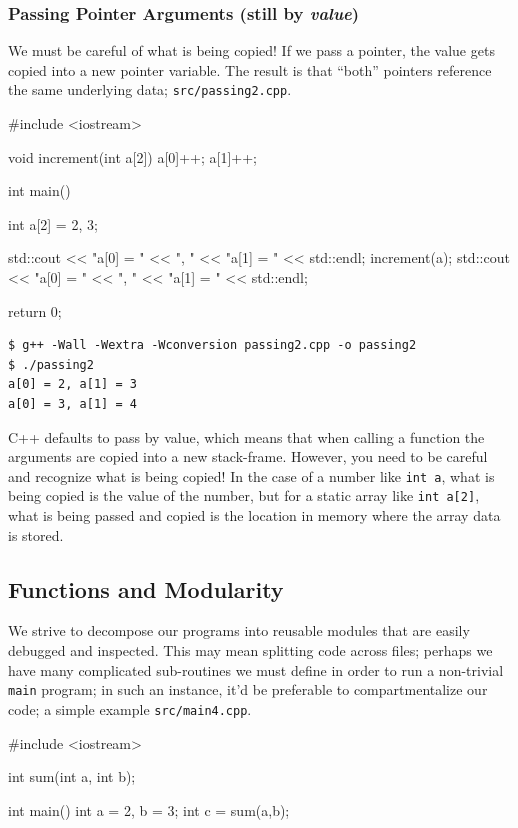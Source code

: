 \documentclass[12pt,letterpaper,twoside]{article}
\begin{document}
\subsubsection{Passing Pointer Arguments (still by \emph{value})}
We must be careful of what is being copied! If we pass a pointer, the value gets 
copied into a new pointer variable. The result is that ``both'' pointers reference the same
underlying data;
\texttt{src/passing2.cpp}.

\begin{cpp}
#include <iostream>

void increment(int a[2]) {
  a[0]++;
  a[1]++;
}

int main() {
  int a[2] = {2, 3};

  std::cout << "a[0] = " << ", " << "a[1] = " << std::endl;
  increment(a);
  std::cout << "a[0] = " << ", " << "a[1] = " << std::endl;
  
  return 0;
}
\end{cpp}

\begin{verbatim}
$ g++ -Wall -Wextra -Wconversion passing2.cpp -o passing2
$ ./passing2
a[0] = 2, a[1] = 3
a[0] = 3, a[1] = 4
\end{verbatim}
C++ defaults to pass by value, which means that when calling a
function the arguments are copied into a new stack-frame.
However, you need to be careful and recognize what is being copied!
In the case of a number like \texttt{int\ a}, what is being copied is
the value of the number, 
but for a static array like \texttt{int\ a{[}2{]}}, 
what is being passed and copied is the location in memory where the 
array data is stored.

\subsection{Functions and Modularity}
We strive to decompose our programs into reusable modules that are easily debugged and 
inspected. This may mean splitting code across files; perhaps we have many complicated
sub-routines we must define in order to run a non-trivial \texttt{main} program; in such
an instance, it'd be preferable to compartmentalize our code; a simple example
\texttt{src/main4.cpp}.

\begin{cpp}
#include <iostream>

int sum(int a, int b);

int main() {
  int a = 2, b = 3;
  int c = sum(a,b);
}
\end{cpp}
\end{document}
